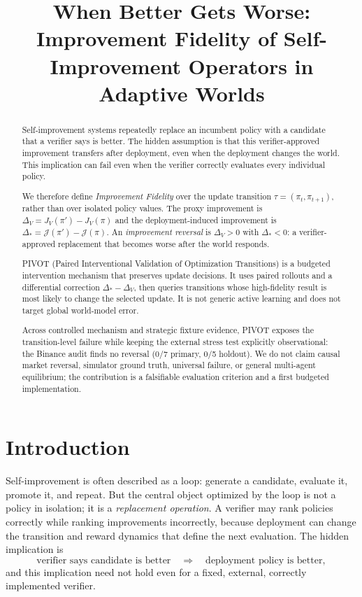 \documentclass{article} %
\title{When Better Gets Worse:\\Improvement Fidelity of Self-Improvement Operators in Adaptive Worlds}
\author{}
\date{}
\newcommand{\J}{\mathcal{J}}
\newcommand{\dproxy}{\Delta_V}
\newcommand{\dtrue}{\Delta_*}
\begin{document}
\maketitle

\begin{abstract}
Self-improvement systems repeatedly replace an incumbent policy with a
candidate that a verifier says is better. The hidden assumption is that this
verifier-approved improvement transfers after deployment, even when the
deployment changes the world. This implication can fail even when the
verifier correctly evaluates every individual policy.

We therefore define \emph{Improvement Fidelity} over the update transition
$\tau=(\pi_t,\pi_{t+1})$, rather than over isolated policy values. The proxy
improvement is $\dproxy=J_V(\pi')-J_V(\pi)$ and the deployment-induced
improvement is $\dtrue=\J(\pi')-\J(\pi)$. An \emph{improvement reversal} is
$\dproxy>0$ with $\dtrue<0$: a verifier-approved replacement that becomes
worse after the world responds.

PIVOT (Paired Interventional Validation of Optimization Transitions) is a
budgeted intervention mechanism that preserves update decisions. It uses
paired rollouts and a differential correction $\Delta_* - \Delta_V$, then
queries transitions whose high-fidelity result is most likely to change the
selected update. It is not generic active learning and does not target global
world-model error.

Across controlled mechanism and strategic fixture evidence, PIVOT exposes the
transition-level failure while keeping the external stress test explicitly
observational: the Binance audit finds no reversal (0/7 primary, 0/5
holdout). We do not claim causal market reversal, simulator ground truth,
universal failure, or general multi-agent equilibrium; the contribution is a
falsifiable evaluation criterion and a first budgeted implementation.
\end{abstract}

\section{Introduction}
Self-improvement is often described as a loop: generate a candidate, evaluate
it, promote it, and repeat. But the central object optimized by the loop is
not a policy in isolation; it is a \emph{replacement operation}. A verifier
may rank policies correctly while ranking improvements incorrectly, because
deployment can change the transition and reward dynamics that define the next
evaluation. The hidden implication is
\begin{equation}
  \text{verifier says candidate is better}
  \quad\Longrightarrow\quad
  \text{deployment policy is better},
\end{equation}
and this implication need not hold even for a fixed, external, correctly
implemented verifier.
\end{document}
